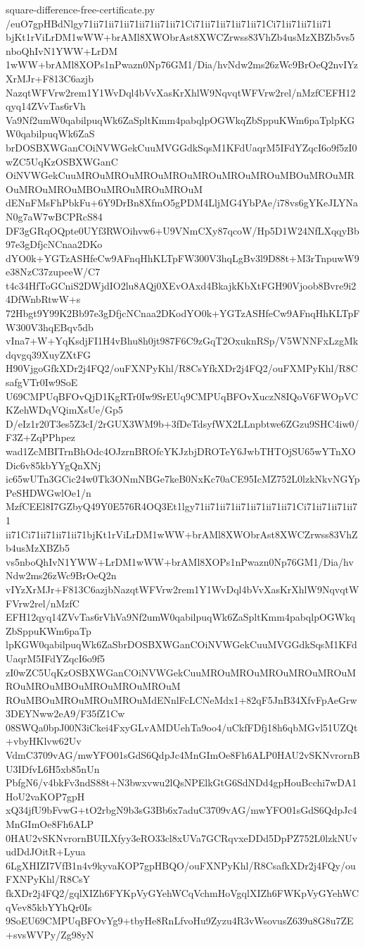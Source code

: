 \documentclass[11pt]{article}
\theoremstyle{definition}
\theoremstyle{remark}
\begin{document}
\begin{filecontents*}[overwrite]{square-difference-free-certificate.py}
/euO7gpHBdNlgy71ii71ii71ii71ii71ii71ii71Ci71ii71ii71ii71ii71Ci71ii71ii71ii71
bjKt1rViLrDM1wWW+brAMl8XWObrAst8XWCZrwss83VhZb4usMzXBZb5vs5nboQhIvN1YWW+LrDM
1wWW+brAMl8XOPs1nPwazn0Np76GM1/Dia/hvNdw2ms26zWc9BrOeQ2nvIYzXrMJr+F813C6azjb
NazqtWFVrw2rem1Y1WvDql4bVvXasKrXhlW9NqvqtWFVrw2rel/nMzfCEFH12qyq14ZVvTas6rVh
Va9Nf2umW0qabilpuqWk6ZaSpltKmm4pabqlpOGWkqZbSppuKWm6paTplpKGW0qabilpuqWk6ZaS
brDOSBXWGanCOiNVWGekCuuMVGGdkSqsM1KFdUaqrM5IFdYZqcI6o9f5zI0wZC5UqKzOSBXWGanC
OiNVWGekCuuMROuMROuMROuMROuMROuMROuMROuMBOuMROuMROuMROuMROuMBOuMROuMROuMROuM
dENnFMsFhPbkFu+6Y9DrBn8XfmO5gPDM4LljMG4YbPAe/i78vs6gYKeJLYNaN0g7aW7wBCPRcS84
DF3gGRqOQpte0UYf3RWOihvw6+U9VNmCXy87qcoW/Hp5D1W24NfLXqqyBb97e3gDfjcNCnaa2DKo
dYO0k+YGTzASHfeCw9AFnqHhKLTpFW300V3hqLgBv3l9D88t+M3rTnpuwW9e38NzC37zupeeW/C7
t4c34HfToGCniS2DWjdIO2lu8AQj0XEvOAxd4BkajkKbXtFGH90Vjoob8Bvre9i24DfWnbRtwW+s
72Hbgt9Y99K2Bb97e3gDfjcNCnaa2DKodYO0k+YGTzASHfeCw9AFnqHhKLTpFW300V3hqEBqv5db
vIna7+W+YqKsdjFI1H4vBhu8h0jt987F6C9zGqT2OxuknRSp/V5WNNFxLzgMkdqvgq39XuyZXtFG
H90VjgoGfkXDr2j4FQ2/ouFXNPyKhl/R8CsYfkXDr2j4FQ2/ouFXMPyKhl/R8CsafgVTr0Iw9SoE
U69CMPUqBFOvQjD1KgRTr0Iw9SrEUq9CMPUqBFOvXuczN8IQoV6FWOpVCKZehWDqVQimXsUe/Gp5
D/eIz1r20T3es5Z3cI/2rGUX3WM9b+3fDeTdsyfWX2LLnpbtwe6ZGzu9SHC4iw0/F3Z+ZqPPhpez
wad1ZcMBITrnBhOdc4OJzrnBROfcYKJzbjDROTeY6JwbTHTOjSU65wYTnXODic6v85kbYYgQnXNj
ic65wUTn3GCic24w0Tk3ONmNBGe7keB0NxKc70aCE95IcMZ752L0lzkNkvNGYpPeSHDWGwlOe1/n
MzfCEEl8I7GZbyQ49Y0E576R4OQ3Et1lgy71ii71ii71ii71ii71ii71ii71Ci71ii71ii71ii71
ii71Ci71ii71ii71ii71bjKt1rViLrDM1wWW+brAMl8XWObrAst8XWCZrwss83VhZb4usMzXBZb5
vs5nboQhIvN1YWW+LrDM1wWW+brAMl8XOPs1nPwazn0Np76GM1/Dia/hvNdw2ms26zWc9BrOeQ2n
vIYzXrMJr+F813C6azjbNazqtWFVrw2rem1Y1WvDql4bVvXasKrXhlW9NqvqtWFVrw2rel/nMzfC
EFH12qyq14ZVvTas6rVhVa9Nf2umW0qabilpuqWk6ZaSpltKmm4pabqlpOGWkqZbSppuKWm6paTp
lpKGW0qabilpuqWk6ZaSbrDOSBXWGanCOiNVWGekCuuMVGGdkSqsM1KFdUaqrM5IFdYZqcI6o9f5
zI0wZC5UqKzOSBXWGanCOiNVWGekCuuMROuMROuMROuMROuMROuMROuMROuMBOuMROuMROuMROuM
ROuMBOuMROuMROuMROuMdENnlFcLCNeMdx1+82qF5JnB34XfvFpAeGrw3DEYNww2eA9/F35fZ1Cw
08SWQa0bpJ00N3iCkei4FxyGLvAMDUehTa9oo4/uCkfFDfj18h6qbMGvl51UZQt+vbyHKlvw62Uv
VdmC3709vAG/mwYFO01sGdS6QdpJc4MnGImOe8Fh6ALP0HAU2vSKNvrornBU3IDfvL6H5xb85nUn
PbfgN6/v4bkFv3ndS88t+N3bwxvwu2lQsNPElkGtG6SdNDd4gpHouBcchi7wDA1HoU2vaKOP7gpH
xQ34jfU9bFvwG+tO2rbgN9b3sG3Bb6x7aduC3709vAG/mwYFO01sGdS6QdpJc4MnGImOe8Fh6ALP
0HAU2vSKNvrornBUILXfyy3eRO33cl8xUVa7GCRqvxeDDd5DpPZ752L0lzkNUvudDdJOitR+Lyua
6LgXHIZI7VfB1n4v9kyvaKOP7gpHBQO/ouFXNPyKhl/R8CsafkXDr2j4FQy/ouFXNPyKhl/R8CsY
fkXDr2j4FQ2/gqlXIZh6FYKpVyGYehWCqVchmHoVgqlXIZh6FWKpVyGYehWCqVev85kbYYhQr0Is
9SoEU69CMPUqBFOvYg9+tbyHe8RnLfvoHu9Zyzu4R3vWsovusZ639u8G8u7ZE+svsWVPy/Zg98yN

\end{filecontents*}
\end{document}
